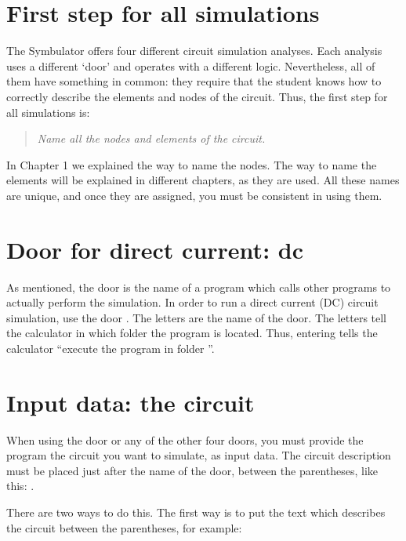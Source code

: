 \section{First step for all simulations}

The Symbulator offers four different circuit simulation analyses.
Each analysis uses a different `door' and operates with a different
logic. Nevertheless, all of them have something in common: they
require that the student knows how to correctly describe the
elements and nodes of the circuit. Thus, the first step for all
simulations is:

\begin{quote}
\emph{Name all the nodes and elements of the circuit.}
\end{quote}

In Chapter 1 we explained the way to name the nodes. The way to name
the elements will be explained in different chapters, as they are
used. All these names are unique, and once they are assigned, you
must be consistent in using them.

\section{Door for direct current: dc}

As mentioned, the door is the name of a program which calls other
programs to actually perform the simulation. In order to run a
direct current (DC) circuit simulation, use the door
. The letters  are the name of the door.
The letters  tell the calculator in which folder the
program  is located. Thus, entering 
tells the calculator ``execute the program  in folder
''.

\section{Input data: the circuit}

When using the  door or any of the other four doors, you
must provide the program the circuit you want to simulate, as input
data. The circuit description must be placed just after the name of
the door, between the parentheses, like this:
.

There are two ways to do this. The first way is to put the text
which describes the circuit between the parentheses, for example:

